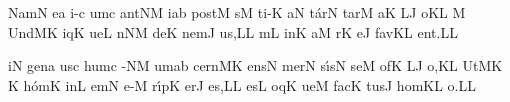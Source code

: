 \smallskip


\initiumgregorianum
{}%
\sgn Nam\punctum N\egn
{}e{}\punctum a\egn
\spatium
{}i-\punctum c\egn
\sgn {}um\punctum c\egn
{}a{nt}\clivis NM\egn
\sgn {}i{}\punctum a\augmentum b\egn
\spatium
\divisiominima
\spatium
\sgn po{st}\punctum M\egn
\spatium
{}s\punctum M\egn
\sgn ti-\punctum K\egn
\sgn {}a{}\punctum N\egn
\spatium
\sgn t{\'a}r\punctum N\egn
\sgn tar\punctum M\egn
\sgn {}a{}\punctum K\egn
\spatium
{}\clivis LJ\egn
\sgn {}o{}\punctum K\augmentum L\egn
\spatium
\divisiominor
\spatium
\custos M
\lineaproxima
\sgn {}U{nd}\clivis MK\egn
\sgn {}iq\punctum K\egn
\sgn ue{}\punctum L\egn
\spatium
{}n\clivis NM\egn
\sgn de{}\punctum K\egn
\spatium
\sgn n{e}m\punctum J\egn
\sgn {}u{s,}\punctum L\augmentum L\egn
\spatium
\divisiominima
\spatium
{}m\punctum L\egn
\sgn {}in\punctum K\egn
\sgn {}a{}\punctum M\egn
\spatium
{}r\punctum K\egn
\sgn {}e{}\punctum J\egn
\spatium
\sgn f{a}v\pes KL\egn
\sgn {}e{nt.}\punctum L\augmentum L\egn
\Finisgregoriana



\smallskip


\initiumgregorianum
{}%
i{}\punctum N\egn
\spatium
\sgn g{e}n\punctum a\egn
\sgn {}us\punctum c\egn
\spatium
\sgn hum\punctum c\egn
{}-\clivis NM\egn
{}um\punctum a\augmentum b\egn
\spatium
\divisiominima
\spatium
\sgn c{e}{rn}\clivis MK\egn
\sgn {}e{ns}\punctum N\egn
\spatium
\sgn mer\punctum N\egn
\sgn s{\'\i}s\punctum N\egn
\sgn se{}\punctum M\egn
\spatium
{}of\punctum K\egn
{}\clivis LJ\egn
\sgn {}o,\punctum K\augmentum L\egn
\spatium
\divisiominor
\spatium
\sgn {}Ut\clivis MK\egn
\spatium
\custos K
\lineaproxima
\sgn h{\'o}m\punctum K\egn
\sgn {}in\punctum L\egn
\sgn {}em\punctum N\egn
\spatium
\sgn {}e-\punctum M\egn
\sgn r{\'\i}p\punctum K\egn
\sgn {}er\punctum J\egn
\sgn {}e{s,}\punctum L\augmentum L\egn
\spatium
\divisiominima
\spatium
\sgn {}es\punctum L\egn
\spatium
{}oq\punctum K\egn
\sgn ue{}\punctum M\egn
\spatium
\sgn f{a}c\punctum K\egn
\sgn tus\punctum J\egn
\spatium
\sgn h{o}m\pes KL\egn
\sgn {}o.\punctum L\augmentum L\egn
\Finisgregoriana



